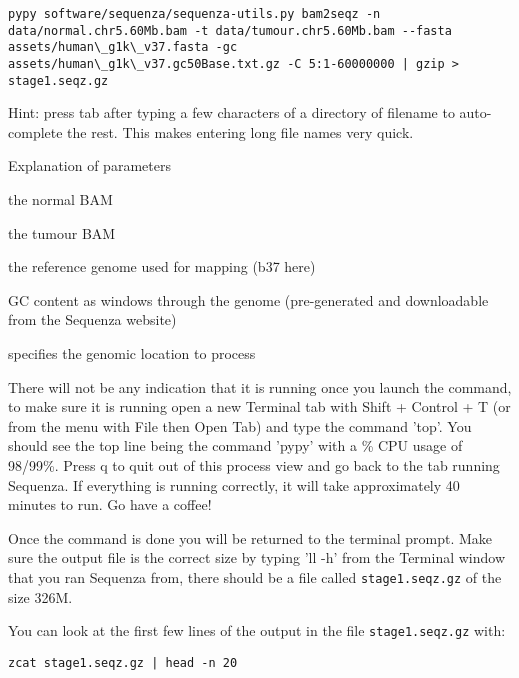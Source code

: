 \begin{steps}
\begin{lstlisting}
pypy software/sequenza/sequenza-utils.py bam2seqz -n data/normal.chr5.60Mb.bam -t data/tumour.chr5.60Mb.bam --fasta assets/human\_g1k\_v37.fasta -gc assets/human\_g1k\_v37.gc50Base.txt.gz -C 5:1-60000000 | gzip > stage1.seqz.gz
\end{lstlisting}
\end{steps}

Hint: press tab after typing a few characters of a directory of filename to auto-complete the rest. This makes entering long file names very quick.

\begin{note}
Explanation of parameters
\begin{description}[style=multiline,labelindent=0cm,align=right,leftmargin=\descriptionlabelspace,rightmargin=1.5cm,font=\ttfamily]
 \item[-n] the normal BAM
 \item[-t] the tumour BAM
 \item[--fasta] the reference genome used for mapping (b37 here)
 \item[-gc] GC content as windows through the genome (pre-generated and downloadable from the Sequenza website)
 \item[-C] specifies the genomic location to process
\end{description}
\end{note}

There will not be any indication that it is running once you launch the command, to make sure it is running open a new Terminal tab with Shift + Control + T (or from the menu with File then Open Tab) and type the command 'top'. You should see the top line being the command 'pypy' with a \% CPU usage of 98/99\%. Press q to quit out of this process view and go back to the tab running Sequenza. If everything is running correctly, it will take approximately 40 minutes to run. Go have a coffee!

Once the command is done you will be returned to the terminal prompt. Make sure the output file is the correct size by typing 'll -h' from the Terminal window that you ran Sequenza from, there should be a file called \texttt{stage1.seqz.gz} of the size 326M.

\begin{information}
You can look at the first few lines of the output in the file \texttt{stage1.seqz.gz} with:
 
\begin{lstlisting}
zcat stage1.seqz.gz | head -n 20
\end{lstlisting}
\end{information}

